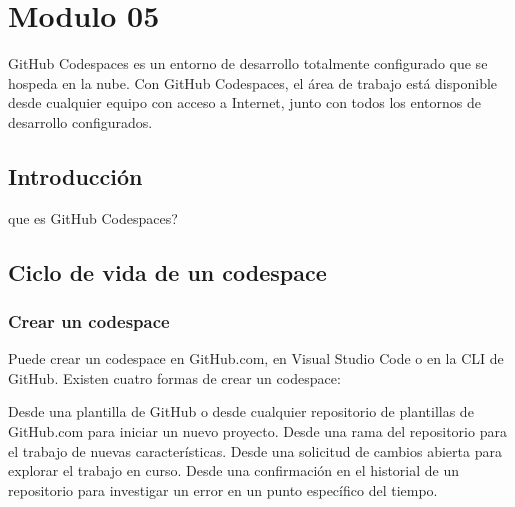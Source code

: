 \section{Modulo 05}


GitHub Codespaces es un entorno de desarrollo totalmente configurado que se hospeda en la nube. Con GitHub Codespaces, el área de trabajo está disponible desde cualquier equipo con acceso a Internet, junto con todos los entornos de desarrollo configurados.

\subsection*{Introducción}
que es GitHub Codespaces?

\subsection*{Ciclo de vida de un codespace}

\subsubsection*{Crear un codespace}
Puede crear un codespace en GitHub.com, en Visual Studio Code o en la CLI de GitHub. Existen cuatro formas de crear un codespace:

Desde una plantilla de GitHub o desde cualquier repositorio de plantillas de GitHub.com para iniciar un nuevo proyecto.
Desde una rama del repositorio para el trabajo de nuevas características.
Desde una solicitud de cambios abierta para explorar el trabajo en curso.
Desde una confirmación en el historial de un repositorio para investigar un error en un punto específico del tiempo.